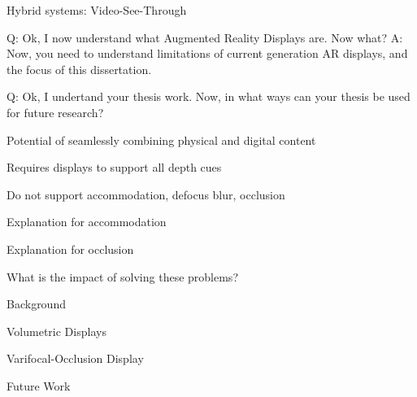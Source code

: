 \begin{compact_itemize}
\begin{compact_itemize}
\begin{compact_todolist}
\begin{compact_todolist}
            \end{compact_todolist}
        \item Hybrid systems: Video-See-Through
        \end{compact_todolist}
    \item Q: Ok, I now understand what Augmented Reality Displays are. Now what? A: Now, you need to understand limitations of current generation AR displays, and the focus of this dissertation.
    \item Q: Ok, I undertand your thesis work. Now, in what ways can your thesis be used for future research?
    \item Potential of seamlessly combining physical and digital content
    \item Requires displays to support all depth cues
    \item Do not support accommodation, defocus blur, occlusion
    \item Explanation for accommodation
    \item {}
    \item Explanation for occlusion
    \item {}
    \item What is the impact of solving these problems?
    \end{compact_itemize}
\item Background
    \begin{compact_itemize}
    \item 
    \end{compact_itemize}
\item Volumetric Displays
    \begin{compact_itemize}
    \item 
    \end{compact_itemize}
\item Varifocal-Occlusion Display
    \begin{compact_itemize}
    \item 
    \end{compact_itemize}
\item Future Work
    \begin{compact_itemize}
    \item {}
    \item {}
    \item {}
    \end{compact_itemize}
\end{compact_itemize}

